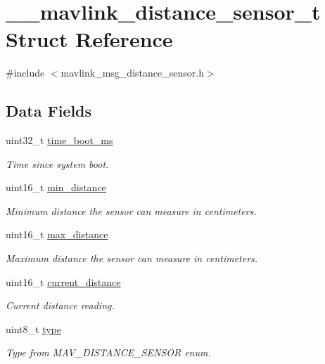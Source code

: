 \hypertarget{struct____mavlink__distance__sensor__t}{\section{\+\_\+\+\_\+mavlink\+\_\+distance\+\_\+sensor\+\_\+t Struct Reference}
\label{struct____mavlink__distance__sensor__t}
}


{\ttfamily \#include $<$mavlink\+\_\+msg\+\_\+distance\+\_\+sensor.\+h$>$}

\subsection*{Data Fields}
\begin{DoxyCompactItemize}
\item 
uint32\+\_\+t \hyperlink{struct____mavlink__distance__sensor__t_a8dbd24433a8cb2c08e0d3675bd99476a}{time\+\_\+boot\+\_\+ms}
\begin{DoxyCompactList}\small\item\em Time since system boot. \end{DoxyCompactList}\item 
uint16\+\_\+t \hyperlink{struct____mavlink__distance__sensor__t_a86645b183bc2be28eb6327a205baff2b}{min\+\_\+distance}
\begin{DoxyCompactList}\small\item\em Minimum distance the sensor can measure in centimeters. \end{DoxyCompactList}\item 
uint16\+\_\+t \hyperlink{struct____mavlink__distance__sensor__t_ad961692c0e76ba99f5239ab5472b1acb}{max\+\_\+distance}
\begin{DoxyCompactList}\small\item\em Maximum distance the sensor can measure in centimeters. \end{DoxyCompactList}\item 
uint16\+\_\+t \hyperlink{struct____mavlink__distance__sensor__t_a62933c0663982034023b0e66dcf84cce}{current\+\_\+distance}
\begin{DoxyCompactList}\small\item\em Current distance reading. \end{DoxyCompactList}\item 
uint8\+\_\+t \hyperlink{struct____mavlink__distance__sensor__t_a8381164d6c466b323c9bf3d07d2a7d82}{type}
\begin{DoxyCompactList}\small\item\em Type from M\+A\+V\+\_\+\+D\+I\+S\+T\+A\+N\+C\+E\+\_\+\+S\+E\+N\+S\+O\+R enum. \end{DoxyCompactList}\item 

\end{DoxyCompactItemize}
